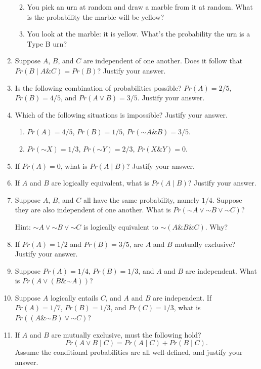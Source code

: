 \documentclass[justified]{tufte-book}
\providecommand{\tightlist}{%
  \setlength{\itemsep}{0pt}\setlength{\parskip}{0pt}}
\newcommand{\given}{\mid}
\renewcommand{\neg}{\mathbin{\sim}}
\renewcommand{\wedge}{\mathbin{\&}}
\newcommand{\p}{Pr}
\theoremstyle{definition}
\theoremstyle{definition}
\theoremstyle{definition}
\theoremstyle{definition}
\theoremstyle{remark}
\begin{document}
\begin{enumerate}
  \begin{enumerate}
  \def\labelenumii{\alph{enumii}.}
  \tightlist
  \item
    You pick an urn at random and draw a marble from it at random. What is the probability the marble will be yellow?
  \item
    You look at the marble: it is yellow. What's the probability the urn is a Type B urn?
  \end{enumerate}
\item
  Suppose \(A\), \(B\), and \(C\) are independent of one another. Does it follow that \(\p(B \given A \wedge C) = \p(B)\)? Justify your answer.
\item
  Is the following combination of probabilities possible? \(Pr(A) = 2/5\), \(Pr(B) = 4/5\), and \(Pr(A \vee B) = 3/5\). Justify your answer.
\item
  Which of the following situations is impossible? Justify your answer.

  \begin{enumerate}
  \def\labelenumii{\alph{enumii}.}
  \tightlist
  \item
    \(\p(A) = 4/5\), \(\p(B) = 1/5\), \(\p(\neg A \wedge B) = 3/5\).
  \item
    \(\p(\neg X) = 1/3\), \(\p(\neg Y) = 2/3\), \(\p(X \wedge Y) = 0\).
  \end{enumerate}
\item
  If \(Pr(A)=0\), what is \(\p(A \given B)\)? Justify your answer.
\item
  If \(A\) and \(B\) are logically equivalent, what is \(\p(A \given B)\)? Justify your answer.
\item
  Suppose \(A\), \(B\), and \(C\) all have the same probability, namely \(1/4\). Suppose they are also independent of one another. What is \(\p(\neg A \vee \neg B \vee \neg C)\)?

  Hint: \(\neg A \vee \neg B \vee \neg C\) is logically equivalent to \(\neg (A \wedge B \wedge C)\). Why?
\item
  If \(\p(A) = 1/2\) and \(\p(B) = 3/5\), are \(A\) and \(B\) mutually exclusive? Justify your answer.
\item
  Suppose \(\p(A) = 1/4\), \(\p(B) = 1/3\), and \(A\) and \(B\) are independent. What is \(\p(A \vee (B \wedge \neg A))\)?
\item
  Suppose \(A\) logically entails \(C\), and \(A\) and \(B\) are independent. If \(\p(A) = 1/7\), \(\p(B) = 1/3\), and \(\p(C)=1/3\), what is \(\p((A \wedge \neg B) \vee \neg C)\)?
\item
  If \(A\) and \(B\) are mutually exclusive, must the following hold?
  \[\p(A \vee B \given C) = \p(A \given C) + \p(B \given C).\]
  Assume the conditional probabilities are all well-defined, and justify your answer.


\end{enumerate}
\end{document}
